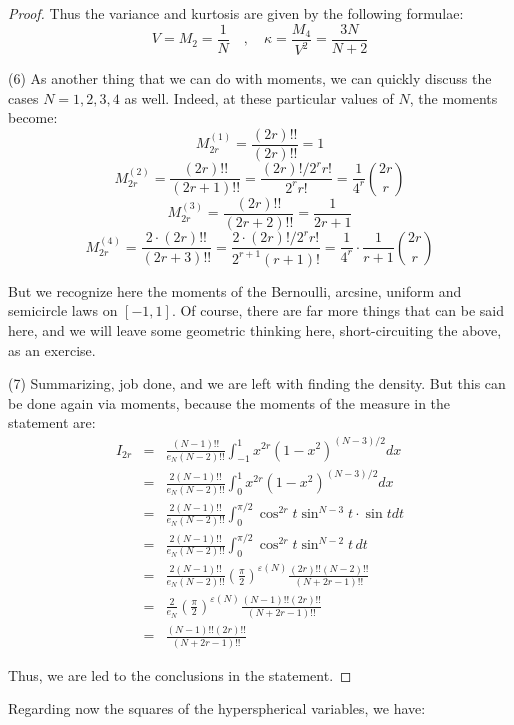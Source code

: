 \documentclass[12pt]{amsbook}
\begin{document}
\begin{proof}
Thus the variance and kurtosis are given by the following formulae:
$$V=M_2=\frac{1}{N}\quad,\quad\kappa=\frac{M_4}{V^2}=\frac{3N}{N+2}$$

(6) As another thing that we can do with moments, we can quickly discuss the cases $N=1,2,3,4$ as well. Indeed, at these particular values of $N$, the moments become:
$$M_{2r}^{(1)}=\frac{(2r)!!}{(2r)!!}=1$$
$$M_{2r}^{(2)}=\frac{(2r)!!}{(2r+1)!!}=\frac{(2r)!/2^rr!}{2^rr!}=\frac{1}{4^r}\binom{2r}{r}$$
$$M_{2r}^{(3)}=\frac{(2r)!!}{(2r+2)!!}=\frac{1}{2r+1}$$
$$M_{2r}^{(4)}=\frac{2\cdot(2r)!!}{(2r+3)!!}=\frac{2\cdot(2r)!/2^rr!}{2^{r+1}(r+1)!}=\frac{1}{4^r}\cdot\frac{1}{r+1}\binom{2r}{r}$$

But we recognize here the moments of the Bernoulli, arcsine, uniform and semicircle laws on $[-1,1]$. Of course, there are far more things that can be said here, and we will leave some geometric thinking here, short-circuiting the above, as an exercise.

\medskip

(7) Summarizing, job done, and we are left with finding the density. But this can be done again via moments, because the moments of the measure in the statement are:
\begin{eqnarray*}
I_{2r}
&=&\frac{(N-1)!!}{e_N(N-2)!!}\int_{-1}^1x^{2r}(1-x^2)^{(N-3)/2}dx\\
&=&\frac{2(N-1)!!}{e_N(N-2)!!}\int_0^1x^{2r}(1-x^2)^{(N-3)/2}dx\\
&=&\frac{2(N-1)!!}{e_N(N-2)!!}\int_0^{\pi/2}\cos^{2r}t\sin^{N-3}t\cdot\sin tdt\\
&=&\frac{2(N-1)!!}{e_N(N-2)!!}\int_0^{\pi/2}\cos^{2r}t\sin^{N-2}t\,dt\\
&=&\frac{2(N-1)!!}{e_N(N-2)!!}\left(\frac{\pi}{2}\right)^{\varepsilon(N)}\frac{(2r)!!(N-2)!!}{(N+2r-1)!!}\\
&=&\frac{2}{e_N}\left(\frac{\pi}{2}\right)^{\varepsilon(N)}\frac{(N-1)!!(2r)!!}{(N+2r-1)!!}\\
&=&\frac{(N-1)!!(2r)!!}{(N+2r-1)!!}
\end{eqnarray*}

Thus, we are led to the conclusions in the statement. 
\end{proof}

Regarding now the squares of the hyperspherical variables, we have:

\end{document}
